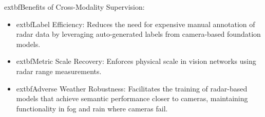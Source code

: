 	extbf{Benefits of Cross-Modality Supervision:}
\begin{itemize}
    \item 	extbf{Label Efficiency:} Reduces the need for expensive manual annotation of radar data by leveraging auto-generated labels from camera-based foundation models.
    \item 	extbf{Metric Scale Recovery:} Enforces physical scale in vision networks using radar range measurements.
    \item 	extbf{Adverse Weather Robustness:} Facilitates the training of radar-based models that achieve semantic performance closer to cameras, maintaining functionality in fog and rain where cameras fail.
\end{itemize}
